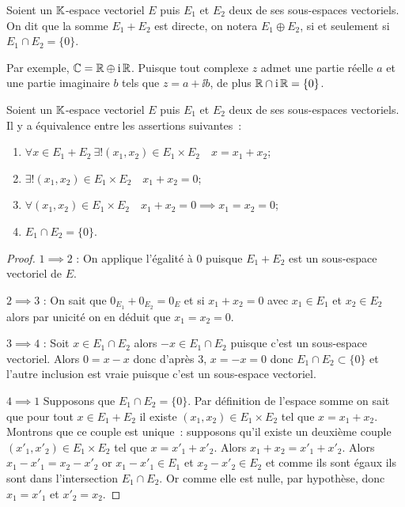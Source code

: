 \begin{defdef}
  Soient un \(\mathbb{K}\)-espace vectoriel \(E\) puis \(E_1\) et \(E_2\) deux de ses
  sous-espaces vectoriels. On dit que la somme \(E_1+E_2\) est directe, on
  notera \(E_1 \oplus E_2\), si et seulement si \(E_1 \cap E_2 =\{0\}\).
\end{defdef}

Par exemple, \(\mathbb{C}=\mathbb{R} \oplus \operatorname{i}\mathbb{R}\). Puisque tout complexe \(z\) admet une
partie réelle \(a\) et une partie imaginaire \(b\) tels que \(z=a+\ii b\), de
plus \(\mathbb{R}\cap \operatorname{i} \mathbb{R}=\{0\}\).

\begin{theo}\label{theo:caracSommeDirecte}
  Soient un \(\mathbb{K}\)-espace vectoriel \(E\) puis \(E_1\) et \(E_2\) deux de ses
  sous-espaces vectoriels. Il y a équivalence entre les assertions suivantes~:
  \begin{enumerate}
    \item \(\forall x \in E_1+E_2 \ \exists! (x_1,x_2) \in E_1 \times E_2 \quad
      x=x_1+x_2\);
    \item \(\exists! (x_1,x_2) \in E_1\times E_2 \quad x_1+x_2=0\);
    \item \(\forall (x_1,x_2) \in E_1\times E_2 \quad x_1+x_2=0 \implies
      x_1=x_2=0\);
    \item \(E_1 \cap E_2 = \{0\}\).
  \end{enumerate}
\end{theo}
\begin{proof}
  \(1 \implies 2\) : On applique l'égalité à \(0\) puisque \(E_1+E_2\) est un
  sous-espace vectoriel de \(E\).

  \(2 \implies 3\) : On sait que \(0_{E_1}+0_{E_2}=0_E\) et si \(x_1+x_2=0\)
  avec \(x_1\in E_1\) et \(x_2\in E_2\) alors par unicité on en déduit que
  \(x_1=x_2=0\).

  \(3 \implies 4\) : Soit \(x \in E_1 \cap E_2\) alors \(-x \in E_1 \cap E_2\)
  puisque c'est un sous-espace vectoriel. Alors \(0=x-x\) donc d'après \(3\),
  \(x=-x=0\) donc \(E_1 \cap E_2 \subset \{0\}\) et l'autre inclusion est vraie
  puisque c'est un sous-espace vectoriel.

  \(4 \implies 1\) Supposons que \(E_1 \cap E_2 = \{0\}\). Par définition de
  l'espace somme on sait que pour tout \(x \in E_1+E_2\) il existe \((x_1,x_2)
  \in E_1 \times E_2\) tel que \(x=x_1+x_2\). Montrons que ce couple est
  unique~: supposons qu'il existe un deuxième couple \((x'_1,x'_2) \in E_1
  \times E_2\) tel que \(x=x'_1+x'_2\). Alors \(x_1+x_2=x'_1+x'_2\). Alors
  \(x_1-x'_1=x_2-x'_2\) or \(x_1 -x'_1 \in E_1\) et \(x_2-x'_2 \in E_2\)  et
  comme ils sont égaux ils sont dans l'intersection \(E_1 \cap E_2\). Or comme
  elle est nulle, par hypothèse, donc \(x_1=x'_1\) et \(x'_2=x_2\).
\end{proof}

